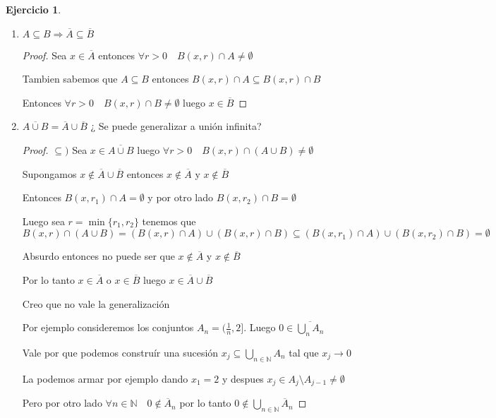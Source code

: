 \documentclass[12pt]{report}
\newcommand{\N}{\mathbb{N}}
\newcommand{\Ra}{\Rightarrow}
\newcommand{\ra}{\rightarrow}
\newcommand{\ol}{\overline}
\theoremstyle{definition}
\newtheorem{ej}{Ejercicio}
\begin{document}
\begin{ej}
\begin{enumerate}
\begin{enumerate}
\begin{proof}
	Ahora $\emptyset \neq \bigcap_{n \in \N} B(x,\frac{1}{n}) \cap X = (\bigcap_{n \in \N} B(x,\frac{1}{n})) \cap X = \{x\} \cap X$

	Entonces $\{x\} \cap X \neq \emptyset$ por lo tanto $x \in X$

	  \end{proof}
	\item $A \subseteq B \Ra \ol A \subseteq \ol B$
	  \begin{proof}
	    Sea $x \in \ol A$ entonces $\forall r>0 \quad B(x,r) \cap A \neq \emptyset$

	    Tambien sabemos que $A \subseteq B$ entonces $B(x,r) \cap A \subseteq B(x,r) \cap B$

	    Entonces $\forall r>0 \quad B(x,r) \cap B \neq \emptyset$ luego $x \in \ol B$
	  \end{proof}
	\item $\ol{A \cup B} = \ol A \cup \ol B$ ¿ Se puede generalizar a unión infinita?
	  \begin{proof}
	$\subseteq ) $ Sea $x \in \ol{A \cup B}$ luego $\forall r>0 \quad B(x,r) \cap (A \cup B) \neq \emptyset$

	Supongamos $x \notin \ol A \cup \ol B$ entonces $x \notin \ol A$ y $x \notin \ol B$

	Entonces $B(x,r_{1}) \cap A = \emptyset$ y por otro lado $B(x,r_{2}) \cap B = \emptyset$

	Luego sea $r = \min{\{r_{1},r_{2}\}}$ tenemos que 
      $$B(x,r) \cap (A \cup B) =(B(x,r) \cap A) \cup (B(x,r) \cap B) \subseteq (B(x,r_{1}) \cap A ) \cup (B(x,r_{2}) \cap B) = \emptyset $$

      Absurdo entonces no puede ser que $x \notin \ol A$ y $x \notin \ol B$

      Por lo tanto $x \in \ol A$ o $x \in \ol B$ luego $x \in \ol A \cup \ol B$

      Creo que no vale la generalización 

      Por ejemplo consideremos los conjuntos $A_n = (\frac{1}{n}, 2]$. Luego $0 \in \ol{\bigcup_{n} A_n}$

      Vale por que podemos construír una sucesión $x_j \subseteq \bigcup_{n \in \N} A_n$ tal que $x_j \ra 0$

      La podemos armar por ejemplo dando $x_1 = 2 $ y despues $x_j \in A_j \setminus A_{j-1} \neq \emptyset$

      Pero por otro lado $\forall n \in \N \quad 0 \notin \ol A_n$ por lo tanto $0 \notin \bigcup_{n\in \N} \ol A_n$


\end{proof}
\end{enumerate}
\end{enumerate}
\end{ej}
\end{document}

